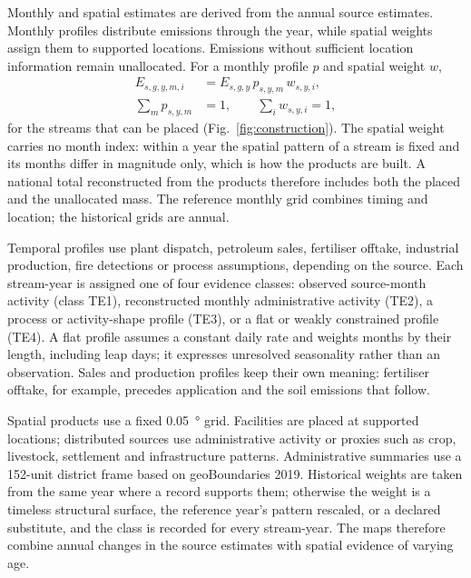 \documentclass[essd,manuscript]{copernicus}
\begin{document}
Monthly and spatial estimates are derived from the annual source estimates. Monthly profiles distribute emissions through the year, while spatial weights assign them to supported locations. Emissions without sufficient location information remain unallocated. For a monthly profile $p$ and spatial weight $w$,
\begin{equation}
\begin{aligned}
 E_{s,g,y,m,i}&=E_{s,g,y}\,p_{s,y,m}\,w_{s,y,i},\\
 \sum_m p_{s,y,m}&=1,\qquad \sum_i w_{s,y,i}=1,
\end{aligned}
 \label{eq:allocation}
\end{equation}
for the streams that can be placed (Fig.~\ref{fig:construction}). The spatial weight carries no month index: within a year the spatial pattern of a stream is fixed and its months differ in magnitude only, which is how the products are built. A national total reconstructed from the products therefore includes both the placed and the unallocated mass. The reference monthly grid combines timing and location; the historical grids are annual.

Temporal profiles use plant dispatch, petroleum sales, fertiliser offtake, industrial production, fire detections or process assumptions, depending on the source. Each stream-year is assigned one of four evidence classes: observed source-month activity (class TE1), reconstructed monthly administrative activity (TE2), a process or activity-shape profile (TE3), or a flat or weakly constrained profile (TE4). A flat profile assumes a constant daily rate and weights months by their length, including leap days; it expresses unresolved seasonality rather than an observation. Sales and production profiles keep their own meaning: fertiliser offtake, for example, precedes application and the soil emissions that follow.

Spatial products use a fixed \SI{0.05}{\degree} grid. Facilities are placed at supported locations; distributed sources use administrative activity or proxies such as crop, livestock, settlement and infrastructure patterns. Administrative summaries use a \num{152}-unit district frame based on geoBoundaries 2019. Historical weights are taken from the same year where a record supports them; otherwise the weight is a timeless structural surface, the reference year's pattern rescaled, or a declared substitute, and the class is recorded for every stream-year. The maps therefore combine annual changes in the source estimates with spatial evidence of varying age.
\end{document}
